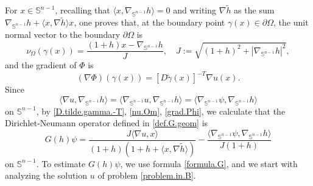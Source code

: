 \documentclass[10pt,reqno,a4paper]{article}
\numberwithin{equation}{section}
\theoremstyle{plain}
\theoremstyle{definition}
\renewcommand{\S}{{\mathbb S}}
\newcommand{\Om}{\Omega}
\newcommand{\la}{\langle}
\newcommand{\ra}{\rangle}
\newcommand{\pa}{\partial}
\newcommand{\grad}{\nabla}
\begin{document}
For $x \in \S^{n-1}$, recalling that $\la x , \grad_{\S^{n-1}} h \ra = 0$ 
and writing $\grad \tilde h$ as the sum
$\grad_{\S^{n-1}} h + \la x , \grad \tilde h \ra x$, 
one proves that, at the boundary point $\gamma(x) \in \pa \Om$,  
the unit normal vector to the boundary $\pa \Om$ is 
\begin{equation} \label{nu.Om}
\nu_\Om(\gamma(x)) = \frac{(1+h) x - \grad_{\S^{n-1}} h}{J}, \quad 
J := \sqrt{ (1+h)^2 + |\grad_{\S^{n-1}}h|^2 },
\end{equation}
and the gradient of $\Phi$ is 
\begin{equation} \label{grad.Phi}
(\grad \Phi)(\gamma(x)) = [D \tilde \gamma(x)]^{-T} \grad u(x).
\end{equation}
Since 
\[
\la \grad u , \grad_{\S^{n-1}} h \ra 
= \la \grad_{\S^{n-1}} u , \grad_{\S^{n-1}} h \ra 
= \la \grad_{\S^{n-1}} \psi , \grad_{\S^{n-1}} h \ra
\]
on $\S^{n-1}$, 
by \eqref{D.tilde.gamma.-T}, \eqref{nu.Om}, \eqref{grad.Phi}, 
we calculate that the Dirichlet-Neumann operator defined in \eqref{def.G.geom} is 
\begin{equation} \label{formula.G} 
G(h)\psi = \frac{J \la \grad u , x \ra }{(1+h)(1+h+\la x, \grad \tilde h \ra)} 
- \frac{ \la \grad_{\S^{n-1}} \psi, \grad_{\S^{n-1}} h \ra }{J (1+h)} 
\end{equation} 
on $\S^{n-1}$. To estimate $G(h)\psi$, we use formula \eqref{formula.G}, 
and we start with analyzing the solution $u$ of problem \eqref{problem.in.B}.
\end{document}
